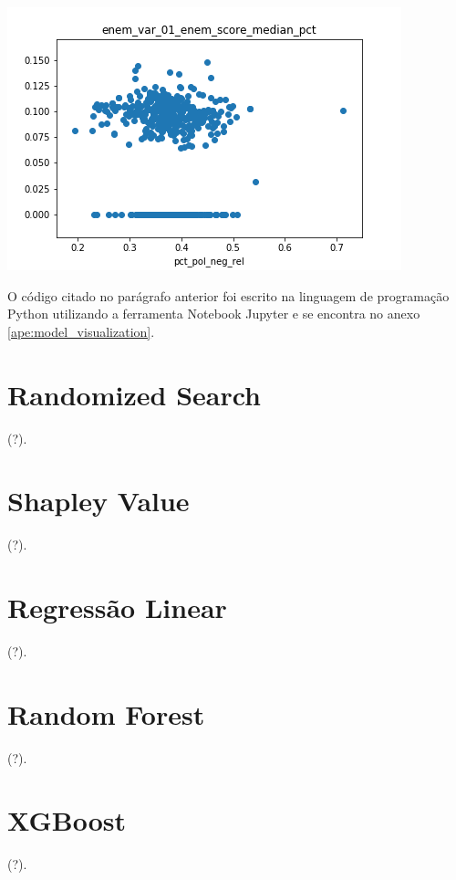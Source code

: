\graphicspath{ {./figuras/two_by_two_scatter_plot/} }
\includegraphics{28_enem_var_01_enem_score_median_pct}

O código citado no parágrafo anterior foi escrito na linguagem de programação Python utilizando a ferramenta Notebook Jupyter e se encontra no anexo \ref{ape:model_visualization}.

\section{Randomized Search}
\label{sec:randomized_search}

(?).

\section{Shapley Value}
\label{sec:shapley_value}

(?).

\section{Regressão Linear}
\label{sec:regressao_linear}

(?).

\section{Random Forest}
\label{sec:random_forest}

(?).

\section{XGBoost}
\label{sec:xgboost}

(?).

